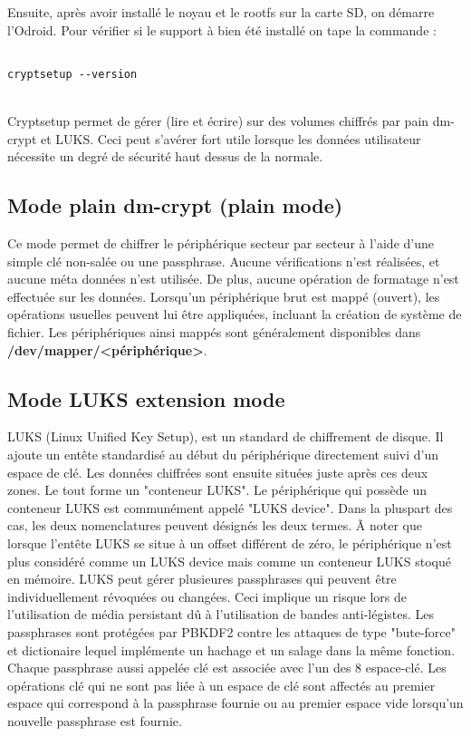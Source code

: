 Ensuite, après avoir installé le noyau et le rootfs sur la carte SD, on démarre l'Odroid. Pour vérifier si le support à bien été installé on tape la commande : 
\begin{lstlisting}[frame=single,style=Console]  % Start your code-block

cryptsetup --version
\end{lstlisting}\\

Cryptsetup permet de gérer (lire et écrire) sur des volumes chiffrés par pain dm-crypt et LUKS. Ceci peut s'avérer fort utile lorsque les données utilisateur nécessite un degré de sécurité haut dessus de la normale.
\subsection{Mode plain dm-crypt (plain mode)}
Ce mode permet de chiffrer le périphérique secteur par secteur à l'aide d'une simple clé non-salée ou une passphrase. Aucune vérifications n'est réalisées, et aucune méta données n'est utilisée. De plus, aucune opération de formatage n'est effectuée sur les données. Lorsqu'un périphérique brut est mappé (ouvert), les opérations usuelles peuvent lui être appliquées, incluant la création de système de fichier. Les périphériques ainsi mappés sont généralement disponibles dans \textbf{/dev/mapper/<périphérique>}.
\subsection{Mode LUKS extension mode}
LUKS (Linux Unified Key Setup), est un standard de chiffrement de disque. Il ajoute un entête standardisé au début du périphérique directement suivi d'un espace de clé. Les données chiffrées sont ensuite situées juste après ces deux zones. Le tout forme un "conteneur LUKS". Le périphérique qui possède un conteneur LUKS est communément appelé "LUKS device". Dans la pluspart des cas, les deux nomenclatures peuvent désignés les deux termes. Ã noter que lorsque l'entête LUKS se situe à un offset différent de zéro, le périphérique n'est plus considéré comme un LUKS device mais comme un conteneur LUKS stoqué en mémoire. LUKS peut gérer plusieures passphrases qui peuvent être individuellement révoquées ou changées. Ceci implique un risque lors de l'utilisation de média persistant dû à l'utilisation de  bandes anti-légistes. Les passphrases sont protégées par PBKDF2 contre les attaques de type "bute-force" et dictionaire lequel implémente un hachage et un salage dans la même fonction. Chaque passphrase aussi appelée clé est associée avec l'un des 8 espace-clé. Les opérations clé qui ne sont pas liée à un espace de clé sont affectés au premier espace qui correspond à la passphrase fournie ou au premier espace vide lorsqu'un nouvelle passphrase est fournie.

